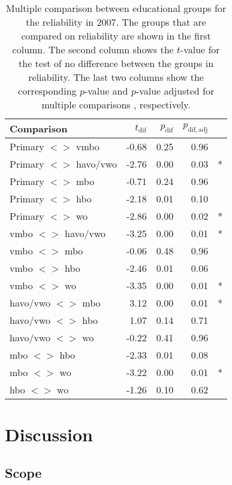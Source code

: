 \documentclass[a4paper, 11pt]{article}
\newcommand{\0}{\boldsymbol{0}}
\begin{document}
\begin{table}[ht]
\begin{center}
\begin{tabular}{lrrrl}
  \hline  \hline
 Comparison & $t_{\mathrm{dif}}$ & $p_{\mathrm{dif}}$ & $p_{\mathrm{dif,adj}}$ &  \\ 
  \hline
Primary $<$$>$ vmbo & -0.68 & 0.25 & 0.96 &  \\ 
Primary $<$$>$ havo/vwo & -2.76 & 0.00 & 0.03 & * \\ 
Primary $<$$>$ mbo & -0.71 & 0.24 & 0.96 &  \\ 
Primary $<$$>$ hbo & -2.18 & 0.01 & 0.10 &  \\ 
Primary $<$$>$ wo & -2.86 & 0.00 & 0.02 & * \\ 
vmbo $<$$>$ havo/vwo & -3.25 & 0.00 & 0.01 & * \\ 
vmbo $<$$>$ mbo & -0.06 & 0.48 & 0.96 &  \\ 
vmbo $<$$>$ hbo & -2.46 & 0.01 & 0.06 &  \\ 
vmbo $<$$>$ wo & -3.35 & 0.00 & 0.01 & * \\ 
 havo/vwo $<$$>$ mbo & 3.12 & 0.00 & 0.01 & * \\ 
 havo/vwo $<$$>$ hbo & 1.07 & 0.14 & 0.71 &  \\ 
 havo/vwo $<$$>$ wo & -0.22 & 0.41 & 0.96 &  \\ 
 mbo $<$$>$ hbo & -2.33 & 0.01 & 0.08 &  \\ 
 mbo $<$$>$ wo & -3.22 & 0.00 & 0.01 & * \\ 
 hbo $<$$>$ wo & -1.26 & 0.10 & 0.62 &  \\ 
   \hline  \hline
\end{tabular}\caption{Multiple comparison between educational groups for the reliability in 2007. 
	The groups that are compared on reliability are shown in the first column. The second column shows the
	$t$-value for the test of no difference between the groups in reliability. The last two columns show 
	the corresponding $p$-value and $p$-value adjusted for multiple comparisons \citep{holm1979simple}, respectively.}\label{tab:tests}
\end{center}
\end{table}


\section{Discussion}

\subsection{Scope}
\end{document}
